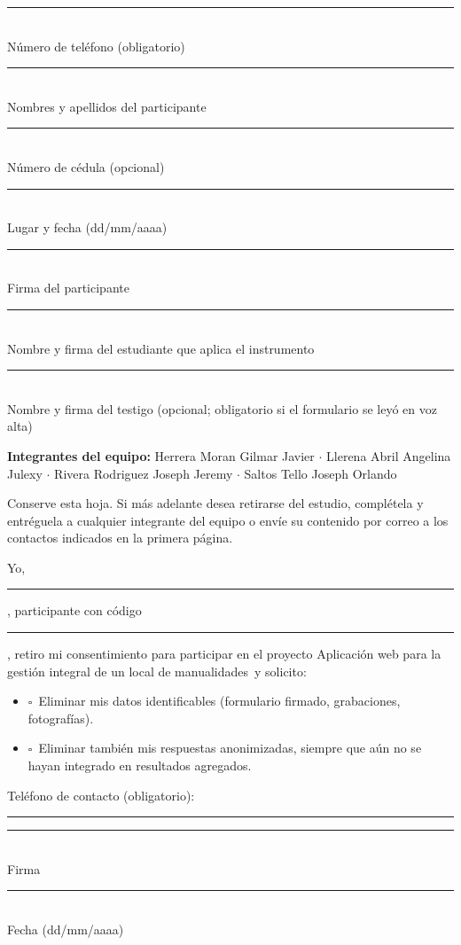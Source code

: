 \documentclass[11pt,a4paper]{article}
\newcommand{\Proyecto}{Aplicaci{\'o}n web para la gesti{\'o}n integral de un local de manualidades}
\newcommand{\caja}{\(\square\)}
\newcommand{\lineafirma}[1]{\parbox[t]{0.46\linewidth}{\centering\rule{\linewidth}{0.5pt}\\[-1pt]\small #1}}
\begin{document}
	\vspace{20pt}
    \noindent\lineafirma{Número de teléfono (obligatorio)}\hfill
    \lineafirma{Nombres y apellidos del participante}

    \vspace{16pt}
    \noindent\lineafirma{Número de cédula (opcional)}\hfill
    \lineafirma{Lugar y fecha (dd/mm/aaaa)}

    \vspace{16pt}
    \noindent\lineafirma{Firma del participante}\hfill
    \lineafirma{Nombre y firma del estudiante que aplica el instrumento}

    \vspace{16pt}
    \noindent\lineafirma{Nombre y firma del testigo (opcional; obligatorio si el formulario se leyó en voz alta)}

    \vspace{137pt}

    \noindent
    {\footnotesize\color{uteqverde}
    \textbf{Integrantes del equipo:}
    Herrera Moran Gilmar Javier $\cdot$
    Llerena Abril Angelina Julexy $\cdot$
    Rivera Rodriguez Joseph Jeremy $\cdot$
    Saltos Tello Joseph Orlando
    }

	\clearpage
	\begin{tcolorbox}[enhanced,colback=white,colframe=uteqverde,boxrule=0.8pt,arc=1.5mm,borderline={0.6pt}{3pt}{uteqverde,dashed},title={\bfseries 9. Revocación del consentimiento (opcional) --- desprendible para el participante},fonttitle=\normalsize,coltitle=white,colbacktitle=uteqverde]
		Conserve esta hoja. Si más adelante desea retirarse del estudio, complétela y entréguela a cualquier integrante del equipo o envíe su contenido por correo a los contactos indicados en la primera página.

		\vspace{10pt}
		Yo, \rule{7.5cm}{0.4pt}, participante con código \rule{2.6cm}{0.4pt}, retiro mi consentimiento para participar en el proyecto \Proyecto\ y solicito:
		\begin{itemize}[label={}]
			\item \caja\ Eliminar mis datos identificables (formulario firmado, grabaciones, fotografías).
			\item \caja\ Eliminar también mis respuestas anonimizadas, siempre que aún no se hayan integrado en resultados agregados.
		\end{itemize}

		\vspace{12pt}
		Teléfono de contacto (obligatorio): \rule{5cm}{0.4pt}

		\vspace{26pt}
		\noindent\lineafirma{Firma}\hfill\lineafirma{Fecha (dd/mm/aaaa)}
	\end{tcolorbox}
\end{document}
